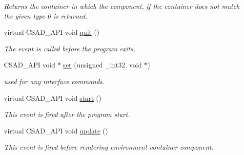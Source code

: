 \begin{DoxyCompactItemize}
\begin{DoxyCompactList}\small\item\em Returns the container in which the component, if the container does not match the given type 0 is returned. \end{DoxyCompactList}\item 
\hypertarget{classcsad_1_1_component_a909c9fe50842ee5fbffee7cb5dde749b}{virtual C\-S\-A\-D\-\_\-\-A\-P\-I void \hyperlink{classcsad_1_1_component_a909c9fe50842ee5fbffee7cb5dde749b}{quit} ()}\label{classcsad_1_1_component_a909c9fe50842ee5fbffee7cb5dde749b}

\begin{DoxyCompactList}\small\item\em The event is called before the program exits. \end{DoxyCompactList}\item 
\hypertarget{classcsad_1_1_component_ad226c8f6c34ec780aaaedd087579ef0b}{C\-S\-A\-D\-\_\-\-A\-P\-I void $\ast$ \hyperlink{classcsad_1_1_component_ad226c8f6c34ec780aaaedd087579ef0b}{set} (unsigned \-\_\-int32, void $\ast$)}\label{classcsad_1_1_component_ad226c8f6c34ec780aaaedd087579ef0b}

\begin{DoxyCompactList}\small\item\em used for any interface commands. \end{DoxyCompactList}\item 
\hypertarget{classcsad_1_1_component_a79c83fa75a1ba6b6c3c53c8449ab14bb}{virtual C\-S\-A\-D\-\_\-\-A\-P\-I void \hyperlink{classcsad_1_1_component_a79c83fa75a1ba6b6c3c53c8449ab14bb}{start} ()}\label{classcsad_1_1_component_a79c83fa75a1ba6b6c3c53c8449ab14bb}

\begin{DoxyCompactList}\small\item\em This event is fired after the program start. \end{DoxyCompactList}\item 
\hypertarget{classcsad_1_1_component_a3e34aeff7ea26d56265237cbcf7a050c}{virtual C\-S\-A\-D\-\_\-\-A\-P\-I void \hyperlink{classcsad_1_1_component_a3e34aeff7ea26d56265237cbcf7a050c}{update} ()}\label{classcsad_1_1_component_a3e34aeff7ea26d56265237cbcf7a050c}

\begin{DoxyCompactList}\small\item\em This event is fired before rendering environment container component. \end{DoxyCompactList}\end{DoxyCompactItemize}

